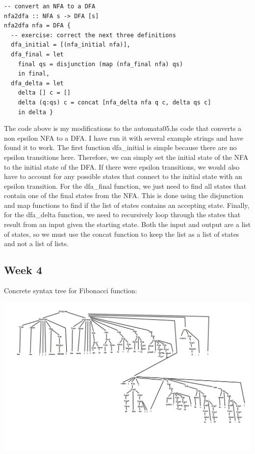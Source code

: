 \documentclass{article}
\theoremstyle{theorem}
\theoremstyle{definition}
\theoremstyle{remark}
\begin{document}
\begin{lstlisting}
-- convert an NFA to a DFA
nfa2dfa :: NFA s -> DFA [s]
nfa2dfa nfa = DFA {
  -- exercise: correct the next three definitions 
  dfa_initial = [(nfa_initial nfa)],
  dfa_final = let
    final qs = disjunction (map (nfa_final nfa) qs)
    in final,
  dfa_delta = let
    delta [] c = []
    delta (q:qs) c = concat [nfa_delta nfa q c, delta qs c]
    in delta }
\end{lstlisting}

The code above is my modifications to the automata05.hs code that converts a non epsilon NFA to a DFA. I have run it with several example strings and have found it to work. The first function dfa\_initial is simple because there are no epsilon transitions here. Therefore, we can simply set the initial state of the NFA to the initial state of the DFA. If there were epsilon transitions, we would also have to account for any possible states that connect to the initial state with an epsilon transition. For the dfa\_final function, we just need to find all states that contain one of the final states from the NFA. This is done using the disjunction and map functions to find if the list of states contains an accepting state. Finally, for the dfa\_delta function, we need to recursively loop through the states that result from an input given the starting state. Both the input and output are a list of states, so we must use the concat function to keep the list as a list of states and not a list of lists.

\subsection{Week 4}

Concrete syntax tree for Fibonacci function:

\includegraphics[scale=0.2]{Images/FibParseTree.png}
\end{document}
